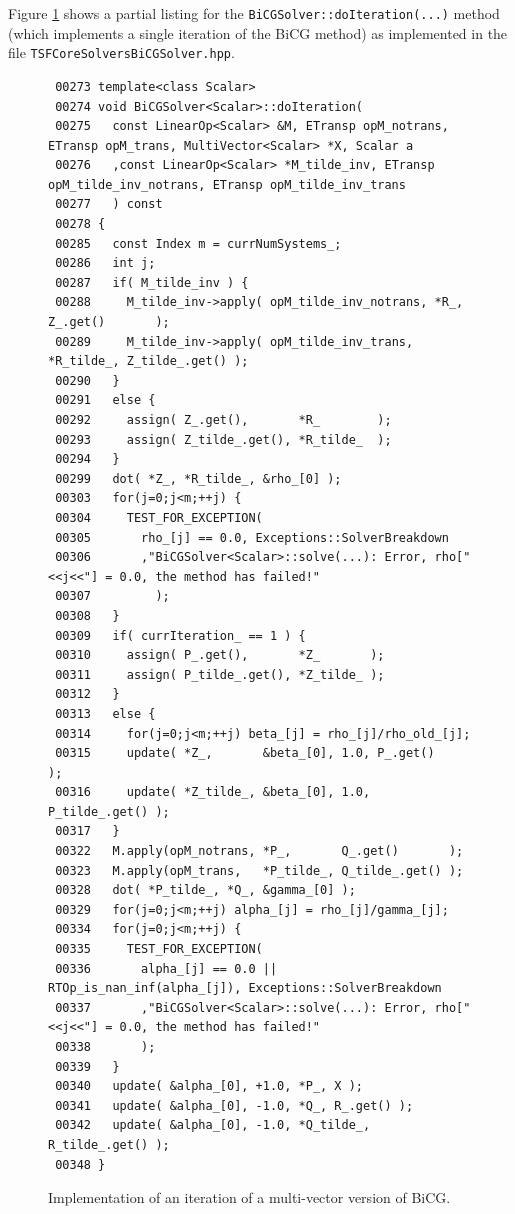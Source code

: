 Figure {}\ref{tsfcore:fig:BiCG_code} shows a partial listing for the
{}\texttt{BiCGSolver\-::doIteration(...)} method (which implements a
single iteration of the BiCG method) as implemented in the file
{}\texttt{TSFCore\-Solvers\-BiCG\-Solver.hpp}.
%
{\bsinglespace
\begin{figure}
\begin{minipage}{\textwidth}
{\scriptsize\begin{verbatim}
 00273 template<class Scalar>
 00274 void BiCGSolver<Scalar>::doIteration(
 00275   const LinearOp<Scalar> &M, ETransp opM_notrans, ETransp opM_trans, MultiVector<Scalar> *X, Scalar a
 00276   ,const LinearOp<Scalar> *M_tilde_inv, ETransp opM_tilde_inv_notrans, ETransp opM_tilde_inv_trans
 00277   ) const
 00278 {
 00285   const Index m = currNumSystems_;
 00286   int j;
 00287   if( M_tilde_inv ) {
 00288     M_tilde_inv->apply( opM_tilde_inv_notrans, *R_,       Z_.get()       );
 00289     M_tilde_inv->apply( opM_tilde_inv_trans,   *R_tilde_, Z_tilde_.get() );
 00290   }
 00291   else {
 00292     assign( Z_.get(),       *R_        );
 00293     assign( Z_tilde_.get(), *R_tilde_  );
 00294   }
 00299   dot( *Z_, *R_tilde_, &rho_[0] );
 00303   for(j=0;j<m;++j) {
 00304     TEST_FOR_EXCEPTION(
 00305       rho_[j] == 0.0, Exceptions::SolverBreakdown
 00306       ,"BiCGSolver<Scalar>::solve(...): Error, rho["<<j<<"] = 0.0, the method has failed!"
 00307         );
 00308   }
 00309   if( currIteration_ == 1 ) {
 00310     assign( P_.get(),       *Z_       );
 00311     assign( P_tilde_.get(), *Z_tilde_ );
 00312   }
 00313   else {
 00314     for(j=0;j<m;++j) beta_[j] = rho_[j]/rho_old_[j];
 00315     update( *Z_,       &beta_[0], 1.0, P_.get()       );
 00316     update( *Z_tilde_, &beta_[0], 1.0, P_tilde_.get() );
 00317   }
 00322   M.apply(opM_notrans, *P_,       Q_.get()       );
 00323   M.apply(opM_trans,   *P_tilde_, Q_tilde_.get() );
 00328   dot( *P_tilde_, *Q_, &gamma_[0] );
 00329   for(j=0;j<m;++j) alpha_[j] = rho_[j]/gamma_[j];
 00334   for(j=0;j<m;++j) {
 00335     TEST_FOR_EXCEPTION(
 00336       alpha_[j] == 0.0 || RTOp_is_nan_inf(alpha_[j]), Exceptions::SolverBreakdown
 00337       ,"BiCGSolver<Scalar>::solve(...): Error, rho["<<j<<"] = 0.0, the method has failed!"
 00338       );
 00339   }
 00340   update( &alpha_[0], +1.0, *P_, X );
 00341   update( &alpha_[0], -1.0, *Q_, R_.get() );
 00342   update( &alpha_[0], -1.0, *Q_tilde_, R_tilde_.get() );
 00348 }
\end{verbatim}}
\end{minipage}
\caption{
\label{tsfcore:fig:BiCG_code}
Implementation of an iteration of a multi-vector version of BiCG.
}
\end{figure}
\esinglespace}
